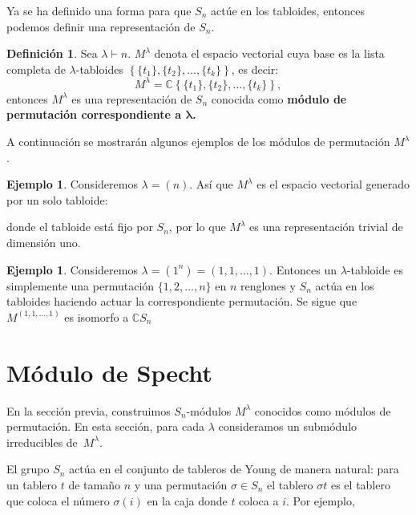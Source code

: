 \documentclass[12pt]{book}
\theoremstyle{definition}
\newtheorem{definition}[theorem]{Definición}
\newtheorem{example}[theorem]{Ejemplo}
\newcounter{in}
\newcounter{ini}
\begin{document}
Ya se ha definido una forma para que $S_{n}$ actúe en los tabloides, entonces
podemos definir una representación de $S_{n}$. 

\begin{definition}
  Sea $\lambda\vdash n$. $M^{\lambda}$ denota el espacio vectorial
  cuya base es la lista completa de $\lambda$-tabloides $\left \{ \{t_{1}\}, \{t_{2}\}, \ldots, \{t_{k}\} \right \}$, es decir:
  $$ M^{\lambda} = \mathbb{C} \left \{ \{t_{1}\}, \{t_{2}\}, \ldots, \{t_{k}\} \right \},$$
  entonces $M^{\lambda}$ es una representación de $S_{n}$ conocida como \textbf{módulo
  de permutación correspondiente a $\boldsymbol{\lambda}$.}
\end{definition}

A continuación se mostrarán algunos ejemplos de los módulos de
permutación $M^{\lambda}$. 

\begin{example}
  Consideremos $\lambda=(n)$. Así que $M^{\lambda}$ es el espacio
  vectorial generado por un solo tabloide:
  \begin{center}
  \end{center}
donde el tabloide está fijo por $S_{n}$, por lo que $M^{\lambda}$ es
una representación trivial de dimensión uno.
\end{example}

\begin{example}
  Consideremos $\lambda=(1^{n})=(1,1,\ldots,1)$. Entonces un $\lambda$-tabloide es
  simplemente una permutación $\{1,2,\ldots,n\}$ en $n$ renglones y $S_{n}$ actúa en los
  tabloides haciendo actuar la correspondiente permutación. Se sigue que $M^{(1,1,\ldots,1)}$ es
  isomorfo a $\mathbb{C}S_{n}$
\end{example}


\section{Módulo de Specht}
\label{modulo-specht}
En la sección previa, construimos $S_{n}$-módulos $M^{\lambda}$
conocidos como módulos de permutación. En esta sección, para cada $\lambda$ consideramos
un submódulo irreducibles de~$M^{\lambda}$.

El grupo $S_{n}$ actúa en el conjunto de tableros de Young de manera
natural: para un tablero $t$ de tamaño $n$ y una permutación $\sigma\in
S_{n}$ el tablero $\sigma t$ es el tablero que coloca el número $\sigma(i)$
en la caja donde $t$ coloca a $i$. Por ejemplo, 
\end{document}
